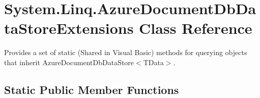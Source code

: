 \hypertarget{classSystem_1_1Linq_1_1AzureDocumentDbDataStoreExtensions}{}\section{System.\+Linq.\+Azure\+Document\+Db\+Data\+Store\+Extensions Class Reference}
\label{classSystem_1_1Linq_1_1AzureDocumentDbDataStoreExtensions}


Provides a set of static (Shared in Visual Basic) methods for querying objects that inherit Azure\+Document\+Db\+Data\+Store$<$\+T\+Data$>$.  


\subsection*{Static Public Member Functions}
